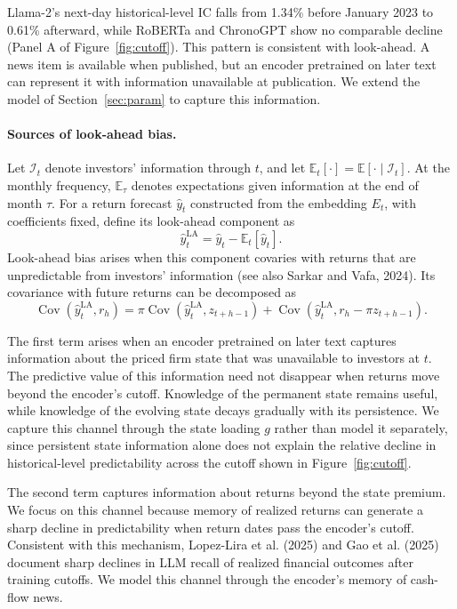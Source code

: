 \documentclass[11pt,letterpaper]{article}
\theoremstyle{remark}
\DeclareMathOperator{\Cov}{Cov}
\begin{document}
Llama-2's next-day historical-level IC falls from 1.34\% before January 2023 to 0.61\% afterward, while RoBERTa and ChronoGPT show no comparable decline (Panel A of Figure~\ref{fig:cutoff}). This pattern is consistent with look-ahead. A news item is available when published, but an encoder pretrained on later text can represent it with information unavailable at publication. We extend the model of Section~\ref{sec:param} to capture this information.

\paragraph{Sources of look-ahead bias.}
Let $\mathcal I_t$ denote investors' information through $t$, and let $\mathbb E_t[\cdot]=\mathbb E[\cdot\mid\mathcal I_t]$. At the monthly frequency, $\mathbb E_\tau$ denotes expectations given information at the end of month $\tau$. For a return forecast $\hat y_t$ constructed from the embedding $E_t$, with coefficients fixed, define its look-ahead component as
\[
\hat y_t^{\mathrm{LA}}=\hat y_t-\mathbb E_t[\hat y_t].
\]
Look-ahead bias arises when this component covaries with returns that are unpredictable from investors' information (see also Sarkar and Vafa, 2024). Its covariance with future returns can be decomposed as
\begin{equation}\label{eq:D21}
\Cov(\hat y_t^{\mathrm{LA}},r_h)
=
\pi\Cov(\hat y_t^{\mathrm{LA}},z_{t+h-1})
+\Cov(\hat y_t^{\mathrm{LA}},r_h-\pi z_{t+h-1}).
\end{equation}

The first term arises when an encoder pretrained on later text captures information about the priced firm state that was unavailable to investors at $t$. The predictive value of this information need not disappear when returns move beyond the encoder's cutoff. Knowledge of the permanent state remains useful, while knowledge of the evolving state decays gradually with its persistence. We capture this channel through the state loading $g$ rather than model it separately, since persistent state information alone does not explain the relative decline in historical-level predictability across the cutoff shown in Figure~\ref{fig:cutoff}.

The second term captures information about returns beyond the state premium. We focus on this channel because memory of realized returns can generate a sharp decline in predictability when return dates pass the encoder's cutoff. Consistent with this mechanism, Lopez-Lira et al. (2025) and Gao et al. (2025) document sharp declines in LLM recall of realized financial outcomes after training cutoffs. We model this channel through the encoder's memory of cash-flow news.
\end{document}
